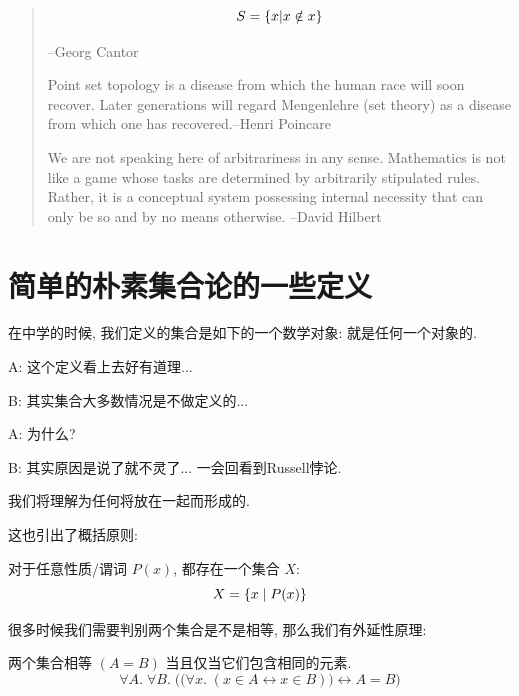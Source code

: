 \begin{quote}
	$$S=\{x|x\notin x\}$$
	
	\hfill --Georg Cantor

	Point set topology is a disease from which the human race will soon recover. Later generations will regard Mengenlehre (set theory) as a disease from which one has recovered.\hfill --Henri Poincare
	
	We are not speaking here of arbitrariness in any sense. Mathematics is not like a game whose tasks are determined by arbitrarily stipulated rules. Rather, it is a conceptual system possessing internal necessity that can only be so and by no means otherwise. \hfill --David Hilbert
\end{quote}

\section{简单的朴素集合论的一些定义}

在中学的时候, 我们定义的集合是如下的一个数学对象: 就是任何一个对象的. 

\begin{dialogue}
	A: 这个定义看上去好有道理...
	
	B: 其实集合大多数情况是不做定义的...
	
	A: 为什么?
	
	B: 其实原因是说了就不灵了... 一会回看到Russell悖论. 
\end{dialogue}

\begin{definition}[集合]
    我们将理解为任何将放在一起而形成的. 
\end{definition}

这也引出了概括原则: 

\begin{theorem}[概括原则]
    对于任意性质/谓词 $P(x)$, 都存在一个集合 $X$:
    \[
      X = \{x \mid P(x)\}
    \]
\end{theorem}

很多时候我们需要判别两个集合是不是相等, 那么我们有外延性原理: 
\begin{definition}
    两个集合相等 $(A = B)$ 当且仅当它们包含相同的元素. 
    \[
      \forall A.\; \forall B.\;
        \Big(\big(\forall x.\; (x \in A \leftrightarrow x \in B)\big)
          \leftrightarrow A = B \Big)
    \]
\end{definition}

